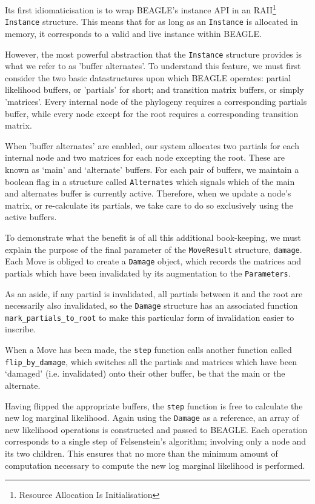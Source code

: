 \documentclass[10pt,journal,compsoc]{IEEEtran}
\begin{document}
Its first idiomaticisation is to wrap BEAGLE's instance API in an RAII\footnote{Resource Allocation Is Initialisation} \texttt{Instance} structure. This means that for as long as an \texttt{Instance} is allocated in memory, it corresponds to a valid and live instance within BEAGLE.

However, the most powerful abstraction that the \texttt{Instance} structure provides is what we refer to as 'buffer alternates'. To understand this feature, we must first consider the two basic datastructures upon which BEAGLE operates: partial likelihood buffers, or 'partials' for short; and transition matrix buffers, or simply 'matrices'. Every internal node of the phylogeny requires a corresponding partials buffer, while every node except for the root requires a corresponding transition matrix.

When 'buffer alternates' are enabled, our system allocates two partials for each internal node and two matrices for each node excepting the root. These are known as `main' and `alternate' buffers. For each pair of buffers, we maintain a boolean flag in a structure called \texttt{Alternates} which signals which of the main and alternates buffer is currently active. Therefore, when we update a node's matrix, or re-calculate its partials, we take care to do so exclusively using the active buffers.

To demonstrate what the benefit is of all this additional book-keeping, we must explain the purpose of the final parameter of the \texttt{MoveResult} structure, \texttt{damage}. Each Move is obliged to create a \texttt{Damage} object, which records the matrices and partials which have been invalidated by its augmentation to the \texttt{Parameters}.

As an aside, if any partial is invalidated, all partials between it and the root are necessarily also invalidated, so the \texttt{Damage} structure has an associated function \texttt{mark\_partials\_to\_root} to make this particular form of invalidation easier to inscribe.

When a Move has been made, the \texttt{step} function calls another function called \texttt{flip\_by\_damage}, which switches all the partials and matrices which have been `damaged' (i.e. invalidated) onto their other buffer, be that the main or the alternate.

Having flipped the appropriate buffers, the \texttt{step} function is free to calculate the new log marginal likelihood. Again using the \texttt{Damage} as a reference, an array of new likelihood operations is constructed and passed to BEAGLE. Each operation corresponds to a single step of Felsenstein's algorithm; involving only a node and its two children. This ensures that no more than the minimum amount of computation necessary to compute the new log marginal likelihood is performed.
\end{document}
